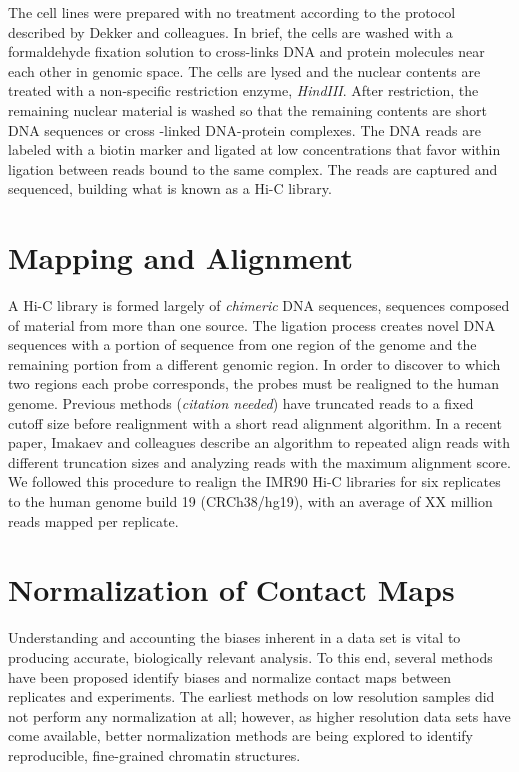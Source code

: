 The cell lines were prepared with no treatment according to the protocol
described by Dekker and colleagues\cite{dekker2013}.  In brief, the cells
are washed with a formaldehyde fixation solution to cross-links DNA and
protein molecules near each other in genomic space.  The cells are
lysed and the nuclear contents are treated with a non-specific restriction
enzyme, \textit{HindIII}.  After restriction, the remaining nuclear material
is washed so that the remaining contents are short DNA sequences or cross
-linked DNA-protein complexes.  The DNA reads are labeled with a biotin
marker and ligated at low concentrations that favor within ligation between
reads bound to the same complex.  The reads are captured and sequenced,
building what is known as a Hi-C library.





\section*{Mapping and Alignment}

A Hi-C library is formed largely of \textit{chimeric} DNA sequences,
sequences composed of material from more than one source.  The ligation process
creates novel DNA sequences with a portion of sequence from one region of
the genome and the remaining portion from a different genomic region.  In
order to discover to which two regions each probe corresponds, the probes
must be realigned to the human genome.  Previous methods (\textit{citation needed})
have truncated reads to a fixed cutoff size before realignment with a short
read alignment algorithm.  In a recent paper, Imakaev and colleagues
describe an algorithm to repeated align reads with different truncation sizes
and analyzing reads with the maximum alignment score\cite{imakaev2012}.  We followed
this procedure to realign the IMR90 Hi-C libraries for six replicates to
the human genome build 19 (CRCh38/hg19), with an average of XX million reads
mapped per replicate.

\section*{Normalization of Contact Maps}

Understanding and accounting the biases inherent in a data set is vital to
producing accurate, biologically relevant analysis.  To this end, several methods
have been proposed identify biases and normalize contact maps between replicates
and experiments\cite{yaffe2011}\cite{hu2012}\cite{yang2014}.  The earliest methods on low
resolution samples did not perform any normalization at all\cite{aiden2009};
however, as higher resolution data sets have come available, better
normalization methods are being explored to identify reproducible,
fine-grained chromatin structures.

